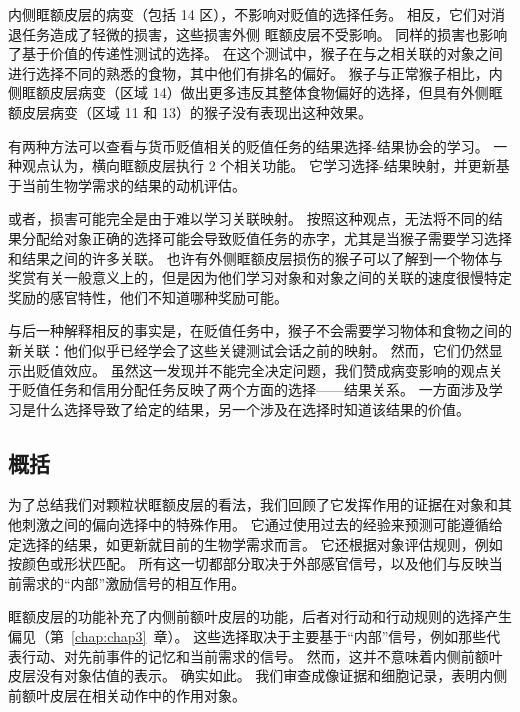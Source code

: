 内侧眶额皮层的病变（包括 14 区），不影响对贬值的选择任务。
相反，它们对消退任务造成了轻微的损害，这些损害外侧 眶额皮层不受影响。
同样的损害也影响了基于价值的传递性测试的选择。
在这个测试中，猴子在与之相关联的对象之间进行选择不同的熟悉的食物，其中他们有排名的偏好。
猴子与正常猴子相比，内侧眶额皮层病变（区域 14）做出更多违反其整体食物偏好的选择，但具有外侧眶额皮层病变（区域 11 和 13）的猴子没有表现出这种效果\cite{rudebeck2011dissociable}。\par


有两种方法可以查看与货币贬值相关的贬值任务的结果选择-结果协会的学习。
一种观点认为，横向眶额皮层执行 2 个相关功能。
它学习选择-结果映射，并更新基于当前生物学需求的结果的动机评估。\par


或者，损害可能完全是由于难以学习关联映射。
按照这种观点，无法将不同的结果分配给对象正确的选择可能会导致贬值任务的赤字，尤其是当猴子需要学习选择和结果之间的许多关联。
也许有外侧眶额皮层损伤的猴子可以了解到一个物体与奖赏有关一般意义上的，但是因为他们学习对象和对象之间的关联的速度很慢特定奖励的感官特性，他们不知道哪种奖励可能。\par


与后一种解释相反的事实是，在贬值任务中，猴子不会需要学习物体和食物之间的新关联：他们似乎已经学会了这些关键测试会话之前的映射。
然而，它们仍然显示出贬值效应。
虽然这一发现并不能完全决定问题，我们赞成病变影响的观点关于贬值任务和信用分配任务反映了两个方面的选择——结果关系。
一方面涉及学习是什么选择导致了给定的结果，另一个涉及在选择时知道该结果的价值。\par



\subsection{概括}

为了总结我们对颗粒状眶额皮层的看法，我们回顾了它发挥作用的证据在对象和其他刺激之间的偏向选择中的特殊作用。
它通过使用过去的经验来预测可能遵循给定选择的结果，如更新就目前的生物学需求而言。
它还根据对象评估规则，例如按颜色或形状匹配。
所有这一切都部分取决于外部感官信号，以及他们与反映当前需求的“内部”激励信号的相互作用。\par


眶额皮层的功能补充了内侧前额叶皮层的功能，后者对行动和行动规则的选择产生偏见（第~\ref{chap:chap3}~章）。
这些选择取决于主要基于“内部”信号，例如那些代表行动、对先前事件的记忆和当前需求的信号。
然而，这并不意味着内侧前额叶皮层没有对象估值的表示。
确实如此。 我们审查成像证据和细胞记录，表明内侧前额叶皮层在相关动作中的作用对象。\par


